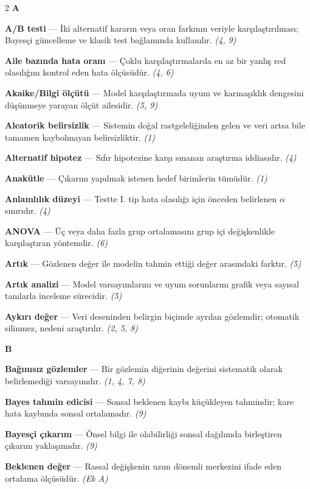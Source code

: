\begin{multicols}{2}
\noindent\textbf{\large A}\par\smallskip
\textbf{A/B testi} --- İki alternatif kararın veya oran farkının veriyle karşılaştırılması; Bayesçi güncelleme ve klasik test bağlamında kullanılır. \emph{(4, 9)}\par
\textbf{Aile bazında hata oranı} --- Çoklu karşılaştırmalarda en az bir yanlış red olasılığını kontrol eden hata ölçüsüdür. \emph{(4, 6)}\par
\textbf{Akaike/Bilgi ölçütü} --- Model karşılaştırmada uyum ve karmaşıklık dengesini düşünmeye yarayan ölçüt ailesidir. \emph{(5, 9)}\par
\textbf{Aleatorik belirsizlik} --- Sistemin doğal rastgeleliğinden gelen ve veri artsa bile tamamen kaybolmayan belirsizliktir. \emph{(1)}\par
\textbf{Alternatif hipotez} --- Sıfır hipotezine karşı sınanan araştırma iddiasıdır. \emph{(4)}\par
\textbf{Anakütle} --- Çıkarım yapılmak istenen hedef birimlerin tümüdür. \emph{(1)}\par
\textbf{Anlamlılık düzeyi} --- Testte I. tip hata olasılığı için önceden belirlenen $\alpha$ sınırıdır. \emph{(4)}\par
\textbf{ANOVA} --- Üç veya daha fazla grup ortalamasını grup içi değişkenlikle karşılaştıran yöntemdir. \emph{(6)}\par
\textbf{Artık} --- Gözlenen değer ile modelin tahmin ettiği değer arasındaki farktır. \emph{(5)}\par
\textbf{Artık analizi} --- Model varsayımlarını ve uyum sorunlarını grafik veya sayısal tanılarla inceleme sürecidir. \emph{(5)}\par
\textbf{Aykırı değer} --- Veri deseninden belirgin biçimde ayrılan gözlemdir; otomatik silinmez, nedeni araştırılır. \emph{(2, 5, 8)}\par
\medskip
\noindent\textbf{\large B}\par\smallskip
\textbf{Bağımsız gözlemler} --- Bir gözlemin diğerinin değerini sistematik olarak belirlemediği varsayımdır. \emph{(1, 4, 7, 8)}\par
\textbf{Bayes tahmin edicisi} --- Sonsal beklenen kaybı küçükleyen tahmindir; kare hata kaybında sonsal ortalamadır. \emph{(9)}\par
\textbf{Bayesçi çıkarım} --- Önsel bilgi ile olabilirliği sonsal dağılımda birleştiren çıkarım yaklaşımıdır. \emph{(9)}\par
\textbf{Beklenen değer} --- Rassal değişkenin uzun dönemli merkezini ifade eden ortalama ölçüsüdür. \emph{(Ek A)}\par

\end{multicols}
